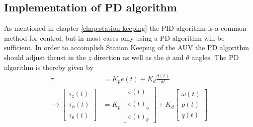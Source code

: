 \subsection{Implementation of PD algorithm}
As mentioned in chapter \ref{chap:station-keeping} the PID algorithm is a common method for control, but in most cases only using a PD algorithm will be sufficient. In order to accomplish Station Keeping of the AUV the PD algorithm should adjust thrust in the $z$ direction as well as the $\phi$ and $\theta$ angles. The PD algorithm is thereby given by
\begin{align}
    \tau & = K_{p}e(t) + K_{d}\frac{d(t)}{dt} \\
    \longrightarrow
    \begin{bmatrix}
    \tau_{z}(t) \\ \tau_{\phi}(t) \\ \tau_{\theta}(t) 
    \end{bmatrix}
    & = K_{p} \begin{bmatrix}
    e(t)_{z} \\ e(t)_{\phi} \\ e(t)_{\theta} 
    \end{bmatrix}
    + K_{d} \begin{bmatrix}
    \omega(t) \\ p(t) \\ q(t)
    \end{bmatrix}
\end{align}
